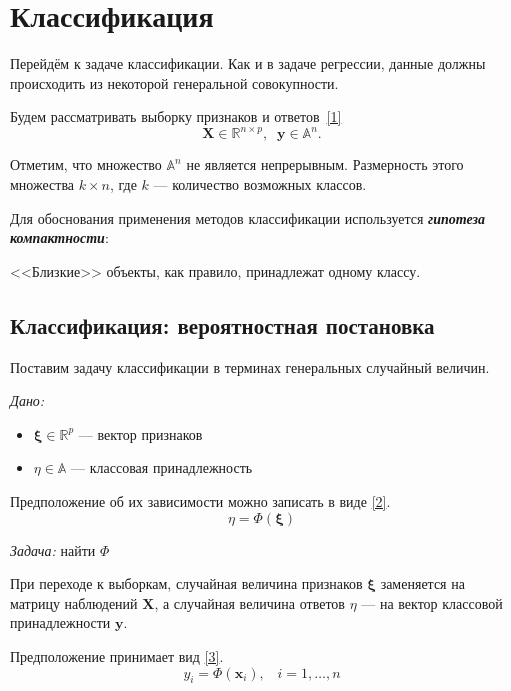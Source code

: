 \documentclass[11pt, oneside]{article}   	%
\begin{document}
		\section{Классификация}
		Перейдём к задаче классификации. Как и в задаче регрессии, данные должны происходить из некоторой генеральной совокупности. 
		
		Будем рассматривать выборку признаков и ответов~\ref{1}
		\begin{equation}
			\bm{X} \in \mathbb{R}^{n\times p}, \;\;\mathbf{y}\in \mathbb{A}^n.
			\label{1}
		\end{equation}
		
		Отметим, что множество $\mathbb{A}^n$ не является непрерывным. Размерность этого множества $k\times n$, где $k$ --- количество возможных классов.
		
		Для обоснования применения методов классификации используется \textbf{\textit{гипотеза компактности}}:
		
		<<Близкие>> объекты, как правило, принадлежат одному классу.
		\newline



		\subsection{Классификация: вероятностная постановка}
		Поставим задачу классификации в терминах генеральных случайный величин.
		
		\textit{Дано:}
		\begin{itemize}
			\item $\bm{\xi} \in \mathbb{R}^p$ --- вектор признаков
			\item $\eta \in \mathbb{A}$ --- классовая принадлежность
		\end{itemize}
	
		Предположение об их зависимости можно записать в виде \ref{2}.
		\begin{equation}
			\eta = \Phi(\bm{\xi})
			\label{2}
		\end{equation}
		
		\textit{Задача:} найти $\Phi$
		
		При переходе к выборкам, случайная величина признаков $\bm{\xi}$ заменяется на матрицу наблюдений $\bm{X}$, а случайная величина ответов $\eta$ --- на вектор классовой принадлежности $\bm{y}$.
		
		Предположение принимает вид \ref{3}.
		\begin{equation}
			y_i = \Phi(\bm{x}_i),\;\;\; i = 1, \ldots, n
			\label{3}
		\end{equation}
		
\end{document}
